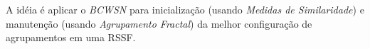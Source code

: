 \documentclass{acm_proc_article-sp}
\begin{document}


A idéia é aplicar o {\it BCWSN} para inicialização (usando {\it Medidas de
Similaridade}) e manutenção (usando {\it Agrupamento Fractal}) da melhor
configuração de agrupamentos em uma RSSF.
\vspace*{-.3cm}

\end{document}
